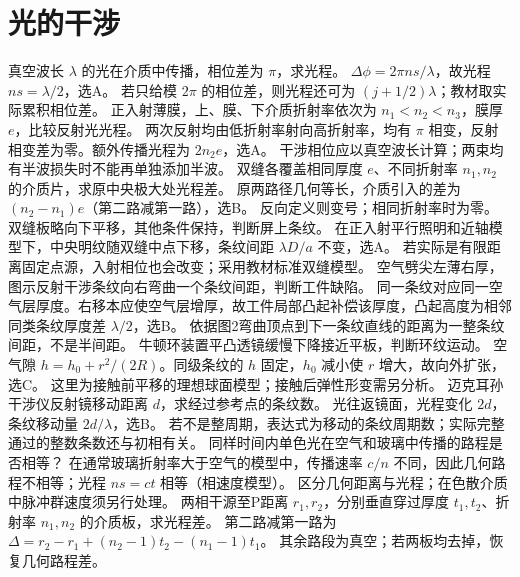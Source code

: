 \section{光的干涉}
\problemtext 真空波长 $\lambda$ 的光在介质中传播，相位差为 $\pi$，求光程。
\workings $\Delta\phi=2\pi ns/\lambda$，故光程 $ns=\lambda/2$，选A。
\crosscheck 若只给模 $2\pi$ 的相位差，则光程还可为 $(j+1/2)\lambda$；教材取实际累积相位差。
\problemtext 正入射薄膜，上、膜、下介质折射率依次为 $n_1<n_2<n_3$，膜厚 $e$，比较反射光光程。
\workings 两次反射均由低折射率射向高折射率，均有 $\pi$ 相变，反射相变差为零。额外传播光程为 $2n_2e$，选A。
\crosscheck 干涉相位应以真空波长计算；两束均有半波损失时不能再单独添加半波。
\problemtext 双缝各覆盖相同厚度 $e$、不同折射率 $n_1,n_2$ 的介质片，求原中央极大处光程差。
\workings 原两路径几何等长，介质引入的差为 $(n_2-n_1)e$（第二路减第一路），选B。
\crosscheck 反向定义则变号；相同折射率时为零。
\problemtext 双缝板略向下平移，其他条件保持，判断屏上条纹。
\workings 在正入射平行照明和近轴模型下，中央明纹随双缝中点下移，条纹间距 $\lambda D/a$ 不变，选A。
\crosscheck 若实际是有限距离固定点源，入射相位也会改变；采用教材标准双缝模型。
\problemtext 空气劈尖左薄右厚，图示反射干涉条纹向右弯曲一个条纹间距，判断工件缺陷。
\workings 同一条纹对应同一空气层厚度。右移本应使空气层增厚，故工件局部凸起补偿该厚度，凸起高度为相邻同类条纹厚度差 $\lambda/2$，选B。
\crosscheck 依据图2弯曲顶点到下一条纹直线的距离为一整条纹间距，不是半间距。
\problemtext 牛顿环装置平凸透镜缓慢下降接近平板，判断环纹运动。
\workings 空气隙 $h=h_0+r^2/(2R)$。同级条纹的 $h$ 固定，$h_0$ 减小使 $r$ 增大，故向外扩张，选C。
\crosscheck 这里为接触前平移的理想球面模型；接触后弹性形变需另分析。
\problemtext 迈克耳孙干涉仪反射镜移动距离 $d$，求经过参考点的条纹数。
\workings 光往返镜面，光程变化 $2d$，条纹移动量 $2d/\lambda$，选B。
\crosscheck 若不是整周期，表达式为移动的条纹周期数；实际完整通过的整数条数还与初相有关。
\problemtext 同样时间内单色光在空气和玻璃中传播的路程是否相等？
\workings 在通常玻璃折射率大于空气的模型中，传播速率 $c/n$ 不同，因此几何路程不相等；光程 $ns=ct$ 相等（相速度模型）。
\crosscheck 区分几何距离与光程；在色散介质中脉冲群速度须另行处理。
\problemtext 两相干源至P距离 $r_1,r_2$，分别垂直穿过厚度 $t_1,t_2$、折射率 $n_1,n_2$ 的介质板，求光程差。
\workings 第二路减第一路为 $\Delta=r_2-r_1+(n_2-1)t_2-(n_1-1)t_1$。
\crosscheck 其余路段为真空；若两板均去掉，恢复几何路程差。
